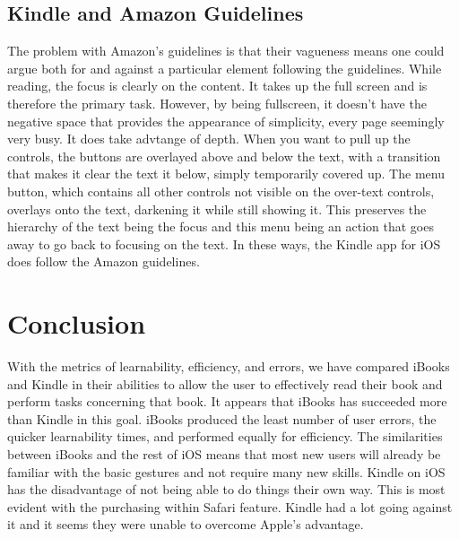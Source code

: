 \documentclass[journal,letterpaper]{article}
\begin{document}
    \subsection{Kindle and Amazon Guidelines}
    The problem with Amazon's guidelines is that their vagueness means one could argue both for and against a particular element following the guidelines. While reading, the focus is clearly on the content. It takes up the full screen and is therefore the primary task. However, by being fullscreen, it doesn't have the negative space that provides the appearance of simplicity, every page seemingly very busy. It does take advtange of depth. When you want to pull up the controls, the buttons are overlayed above and below the text, with a transition that makes it clear the text it below, simply temporarily covered up. The menu button, which contains all other controls not visible on the over-text controls, overlays onto the text, darkening it while still showing it. This preserves the hierarchy of the text being the focus and this menu being an action that goes away to go back to focusing on the text. In these ways, the Kindle app for iOS does follow the Amazon guidelines.

    \section{Conclusion}
    \label{Conclusion}

    With the metrics of learnability, efficiency, and errors, we have compared iBooks and Kindle in their abilities to allow the user to effectively read their book and perform tasks concerning that book. It appears that iBooks has succeeded more than Kindle in this goal. iBooks produced the least number of user errors, the quicker learnability times, and performed equally for efficiency. The similarities between iBooks and the rest of iOS means that most new users will already be familiar with the basic gestures and not require many new skills. Kindle on iOS has the disadvantage of not being able to do things their own way. This is most evident with the purchasing within Safari feature. Kindle had a lot going against it and it seems they were unable to overcome Apple's advantage.
\end{document}
